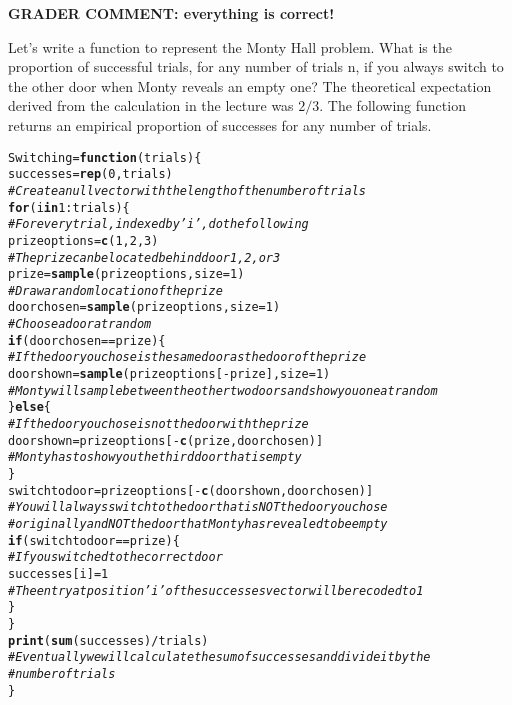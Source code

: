 \documentclass[12pt,letter]{article}\usepackage[]{graphicx}\usepackage[]{color}
\makeatletter
\newcommand{\hlnum}[1]{\textcolor[rgb]{0.686,0.059,0.569}{#1}}%
\newcommand{\hlcom}[1]{\textcolor[rgb]{0.678,0.584,0.686}{\textit{#1}}}%
\newcommand{\hlopt}[1]{\textcolor[rgb]{0,0,0}{#1}}%
\newcommand{\hlstd}[1]{\textcolor[rgb]{0.345,0.345,0.345}{#1}}%
\newcommand{\hlkwa}[1]{\textcolor[rgb]{0.161,0.373,0.58}{\textbf{#1}}}%
\newcommand{\hlkwb}[1]{\textcolor[rgb]{0.69,0.353,0.396}{#1}}%
\newcommand{\hlkwc}[1]{\textcolor[rgb]{0.333,0.667,0.333}{#1}}%
\newcommand{\hlkwd}[1]{\textcolor[rgb]{0.737,0.353,0.396}{\textbf{#1}}}%
\newenvironment{kframe}{%
 \def\at@end@of@kframe{}%
 \ifinner\ifhmode%
  \def\at@end@of@kframe{\end{minipage}}%
  \begin{minipage}{\columnwidth}%
 \fi\fi%
 \def\FrameCommand##1{\hskip\@totalleftmargin \hskip-\fboxsep
 \colorbox{shadecolor}{##1}\hskip-\fboxsep
     \hskip-\linewidth \hskip-\@totalleftmargin \hskip\columnwidth}%
 \MakeFramed {\advance\hsize-\width
   \@totalleftmargin\z@ \linewidth\hsize
   \@setminipage}}%
 {\par\unskip\endMakeFramed%
 \at@end@of@kframe}
\newenvironment{knitrout}{}{} %
\makeatother
\begin{document}
\textbf{\color{red} GRADER COMMENT: everything is correct!}

Let's write a function to represent the Monty Hall problem. What is the proportion of successful trials, for any number of trials n, if you always switch to the other door when Monty reveals an empty one? The theoretical expectation derived from the calculation in the lecture was $2/3$. The following function returns an empirical proportion of successes for any number of trials.

\begin{knitrout}
\color{fgcolor}\begin{kframe}
\begin{alltt}
\hlstd{Switching} \hlkwb{=} \hlkwa{function}\hlstd{(}\hlkwc{trials}\hlstd{) \{}
    \hlstd{successes} \hlkwb{=} \hlkwd{rep}\hlstd{(}\hlnum{0}\hlstd{, trials)}
    \hlcom{# Create a null vector with the length of the number of trials}
    \hlkwa{for} \hlstd{(i} \hlkwa{in} \hlnum{1}\hlopt{:}\hlstd{trials) \{}
        \hlcom{# For every trial, indexed by 'i', do the following}
        \hlstd{prizeoptions} \hlkwb{=} \hlkwd{c}\hlstd{(}\hlnum{1}\hlstd{,} \hlnum{2}\hlstd{,} \hlnum{3}\hlstd{)}
        \hlcom{# The prize can be located behind door 1, 2, or 3}
        \hlstd{prize} \hlkwb{=} \hlkwd{sample}\hlstd{(prizeoptions,} \hlkwc{size} \hlstd{=} \hlnum{1}\hlstd{)}
        \hlcom{# Draw a random location of the prize}
        \hlstd{doorchosen} \hlkwb{=} \hlkwd{sample}\hlstd{(prizeoptions,} \hlkwc{size} \hlstd{=} \hlnum{1}\hlstd{)}
        \hlcom{# Choose a door at random}
        \hlkwa{if} \hlstd{(doorchosen} \hlopt{==} \hlstd{prize) \{}
            \hlcom{# If the door you chose is the same door as the door of the prize}
            \hlstd{doorshown} \hlkwb{=} \hlkwd{sample}\hlstd{(prizeoptions[}\hlopt{-}\hlstd{prize],} \hlkwc{size} \hlstd{=} \hlnum{1}\hlstd{)}
            \hlcom{# Monty will sample between the other two doors and show you one at random}
        \hlstd{\}} \hlkwa{else} \hlstd{\{}
            \hlcom{# If the door you chose is not the door with the prize}
            \hlstd{doorshown} \hlkwb{=} \hlstd{prizeoptions[}\hlopt{-}\hlkwd{c}\hlstd{(prize, doorchosen)]}
            \hlcom{# Monty has to show you the third door that is empty}
        \hlstd{\}}
        \hlstd{switchtodoor} \hlkwb{=} \hlstd{prizeoptions[}\hlopt{-}\hlkwd{c}\hlstd{(doorshown, doorchosen)]}
        \hlcom{# You will always switch to the door that is NOT the door you chose}
        \hlcom{# originally and NOT the door that Monty has revealed to be empty}
        \hlkwa{if} \hlstd{(switchtodoor} \hlopt{==} \hlstd{prize) \{}
            \hlcom{# If you switched to the correct door}
            \hlstd{successes[i]} \hlkwb{=} \hlnum{1}
            \hlcom{# The entry at position 'i' of the successes vector will be recoded to 1}
        \hlstd{\}}
    \hlstd{\}}
    \hlkwd{print}\hlstd{(}\hlkwd{sum}\hlstd{(successes)}\hlopt{/}\hlstd{trials)}
    \hlcom{# Eventually we will calculate the sum of successes and divide it by the}
    \hlcom{# number of trials}
\hlstd{\}}


\end{alltt}
\end{kframe}
\end{knitrout}
\end{document}
